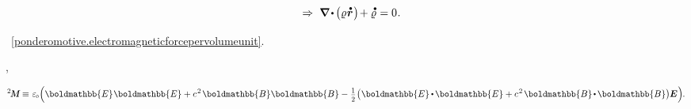 \nopagebreak\vspace{-0.1em}\begin{equation}\label{continuity.balanceofelectriccharge}
\hspace*{1em}\Rightarrow\hspace{.7ex}
\boldnabla \hspace{-0.15ex} \dotp \hspace{-0.15ex} \bigl( \chargedensity \hspace{.1ex} \mathdotabove{\locationvector} \hspace{.1ex} \bigr) \hspace{-0.3ex} + \mathdotabove{\chargedensity} \hspace{.1ex} = 0
\hspace{.1ex} .
\vspace{-0.5em}\end{equation}


~\eqref{ponderomotive.electromagneticforcepervolumeunit}.

,
\href{https://en.wikipedia.org/wiki/Maxwell_stress_tensor}{}

\nopagebreak\vspace{\en{-0.1em}\ru{-0.25em}}
\begin{equation}\label{maxwellstresstensor:definition}
\maxwellstress \equiv \hspace{.12ex}
\vacuumpermittivity \hspace{-0.33ex} \left(
\boldmathbb{E} \hspace{.1ex} \boldmathbb{E} + c^{\hspace{.16ex}2} \hspace{.22ex} \boldmathbb{B} \boldmathbb{B}
- \hspace{.1ex} \smalldisplaystyleonehalf \hspace{.1ex} \bigl( \hspace{.1ex} \boldmathbb{E} \hspace{-0.1ex} \dotp \hspace{-0.15ex} \boldmathbb{E} + c^{\hspace{.16ex}2} \hspace{.22ex} \boldmathbb{B} \hspace{-0.2ex} \dotp \hspace{-0.16ex} \boldmathbb{B} \bigr) \hspace{-0.06ex} \UnitDyad \hspace{.05ex}
\right)
\hspace{-0.22em} .
\end{equation}


